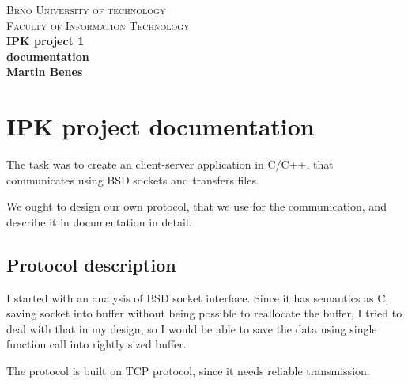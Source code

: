 \documentclass[10pt,a4paper,titlepage]{article}
\begin{document}
\begin{titlepage}

\begin{center}
\textsc{\LARGE Brno University of technology}\\[0.5cm]
\textsc{\large Faculty of Information Technology}\\[8cm]

{ \huge \bfseries IPK project 1}\\[0.3cm]
{ \Large \bfseries documentation}\\[0.5cm]
{ \bfseries Martin Benes}\\

\end{center}

\end{titlepage}
\newpage


\setcounter{page}{1}

\section{IPK project documentation}
The task was to create an client-server application in C/C++, that communicates
using BSD sockets and transfers files.

We ought to design our own protocol, that we use for the communication, and
describe it in documentation in detail.

\subsection{Protocol description}
I started with an analysis of BSD socket interface. Since it has semantics
as C, saving socket into buffer without being possible to reallocate the buffer,
I tried to deal with that in my design, so I would be able to save the data
using single function call into rightly sized buffer.

The protocol is built on TCP protocol, since it needs reliable transmission.
\end{document}
